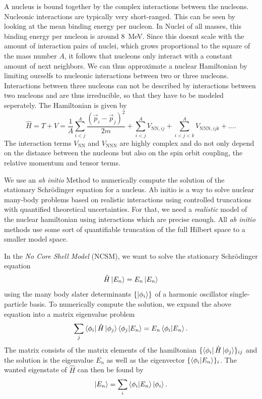 
A nucleus is bound together by the complex interactions between the nucleons. Nucleonic interactions are typically very short-ranged. This can be seen by looking at the mean binding energy per nucleon. In Nuclei of all masses, this binding energy per nucleon is around \SI{8}{\mega\electronvolt}. Since this doesnt scale with the amount of interaction pairs of nuclei, which grows proportional to the square of the mass number $A$, it follows that nucleons only interact with a constant amount of next neighbors. We can thus approximate a nuclear Hamiltonian by limiting ourselfs to nucleonic interactions between two or three nucleons. Interactions between three nucleons can not be described by interactions between two nucleons and are thus irreducible, so that they have to be modeled seperately. The Hamiltonian is given by
\begin{equation}
  \hat{H} = T + V = \frac{1}{A}\sum_{i<j}^A\frac{(\vec{p}_i - \vec{p}_j)^2}{2m} + \sum_{i<j}^A V_{\mathrm{NN}, ij} + \sum_{i<j<k}^AV_{\mathrm{NNN}, ijk} + \dots.
\end{equation}
The interaction terms $V_\mathrm{NN}$ and $V_\mathrm{NNN}$ are highly complex and do not only depend on the distance between the nucleons but also on the spin orbit coupling, the relative momentum and tensor terms.

We use an \textit{ab initio} Method to numerically compute the solution of the stationary Schrödinger equation for a nucleus. Ab initio is a way to solve nuclear many-body problems based on realistic interactions using controlled truncations with quantified theoretical uncertainties. For that, we need a \textit{realistic} model of the nuclear hamiltonian using interactions which are precise enough. All \textit{ab initio} methods use some sort of quantifiable truncation of the full Hilbert space to a smaller model space.

In the \textit{No Core Shell Model} (NCSM), we want to solve the stationary Schrödinger equation
\begin{equation}
  \hat{H} \ket{E_n} = E_n \ket{E_n}
\end{equation}
using the many body slater determinants $\{\ket{\phi_i}\}$ of a harmonic oscillator single-particle basis. To numerically compute the solution, we expand the above equation into a matrix eigenvalue problem
\begin{equation}
  \sum_j \bra{\phi_i}\hat{H}\ket{\phi_j}\braket{\phi_j | E_n} = E_n \braket{\phi_i | E_n}.
\end{equation}
The matrix consists of the matrix elements of the hamiltonian $\{\bra{\phi_i}\hat{H}\ket{\phi_j}\}_{ij}$ and the solution is the eigenvalue $E_n$ as well as the eigenvector $\{\braket{\phi_i|E_n}\}_i$. The wanted eigenstate of $\hat{H}$ can then be found by
\begin{equation}
  \ket{E_n} = \sum_i \braket{\phi_i | E_n} \ket{\phi_i}.
\end{equation}

